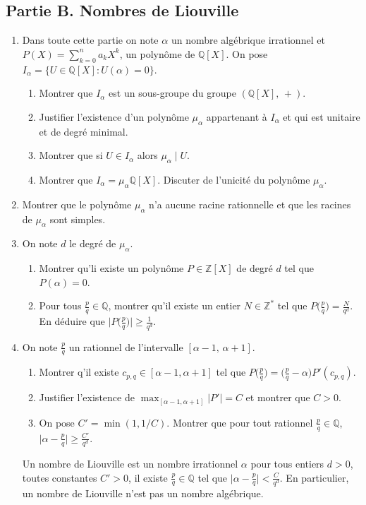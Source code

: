 \documentclass{article}
\begin{document}
\subsection{Partie B. Nombres de Liouville}
	\begin{enumerate}
		\item Dans toute cette partie on note $\alpha$ un nombre algébrique irrationnel et $P(X) = \sum_{k=0}^n a_kX^k$, un polynôme de $\mathbb{Q}[X]$.
		On pose $I_{\alpha} = \{U \in \mathbb{Q}[X] : U(\alpha) = 0\}$.
		\begin{enumerate}
			\item Montrer que $I_{\alpha}$ est un sous-groupe du groupe $(\mathbb{Q}[X],\,+)$.
			\item Justifier l'existence d'un polynôme $\mu_{\alpha}$ appartenant à $I_{\alpha}$ et qui est unitaire et de degré minimal.
			\item Montrer que si $U\in I_{\alpha}$ alors $\mu_{\alpha}\mid U$.
			\item Montrer que $I_{\alpha}=\mu_{\alpha}\mathbb{Q}[X]$. Discuter de l'unicité du polynôme $\mu_{\alpha}$.
		\end{enumerate}
	\item Montrer que le polynôme $\mu_{\alpha}$ n'a aucune racine rationnelle et que les racines de $\mu_{\alpha}$ sont simples.
	\item On note $d$ le degré de $\mu_{\alpha}$.
		\begin{enumerate}
			\item Montrer qu'li existe un polynôme $P\in\mathbb{Z}[X]$ de degré $d$ tel que $P(\alpha) = 0$.
			\item Pour tous $\frac{p}{q}\in\mathbb{Q}$, montrer qu'il existe un entier $N\in\mathbb{Z}^*$ tel que $P\Big(\frac{p}{q}\Big) = \frac{N}{q^d}$. En déduire que $\Big|P\Big(\frac{p}{q}\Big)\Big| \geq \frac{1}{q^d}$.
		\end{enumerate}
	\item On note $\frac{p}{q}$ un rationnel de l'intervalle $[\alpha-1,\, \alpha+1]$.
		\begin{enumerate}
			\item Montrer q'il existe $c_{p,q} \in [\alpha-1,\alpha+1]$ tel que $P\Big(\frac{p}{q}\Big) = \Big(\frac{p}{q}-\alpha\Big)P'(c_{p,q})$.
			\item Justifier l'existence de $\max_{[\alpha-1,\alpha+1]}|P'| = C$ et montrer que $C>0$.
			\item On pose $C' = \min(1, 1/C)$. Montrer que pour tout rationnel $\frac{p}{q}\in\mathbb{Q}$, $\Big|\alpha-\frac{p}{q}\Big| \geq \frac{C'}{q^d}$.
		\end{enumerate}
		Un nombre de Liouville est un nombre irrationnel $\alpha$ pour tous entiers $d >0$, toutes constantes $C' > 0$, il existe $\frac{p}{q}\in\mathbb{Q}$ tel que $\Big|\alpha-\frac{p}{q}\Big| <\frac{C}{q^d}$. En particulier, un nombre de Liouville n'est pas un nombre algébrique.
\end{enumerate}
\end{document}
